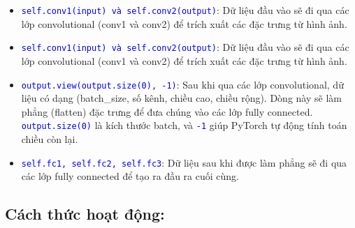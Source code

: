\begin{itemize}
    \item \textcolor{blue}{\texttt{self.conv1(input) và self.conv2(output)}}: Dữ liệu đầu vào sẽ đi qua các lớp convolutional (conv1 và conv2) để trích xuất các đặc trưng từ hình ảnh.
    \item \textcolor{blue}{\texttt{self.conv1(input) và self.conv2(output)}}: Dữ liệu đầu vào sẽ đi qua các lớp convolutional (conv1 và conv2) để trích xuất các đặc trưng từ hình ảnh.
    \item \textcolor{blue}{\texttt{output.view(output.size(0), -1)}}: Sau khi qua các lớp convolutional, dữ liệu có dạng (batch\_size, số kênh, chiều cao, chiều rộng). Dòng này sẽ làm phẳng (flatten) đặc trưng để đưa chúng vào các lớp fully connected. \textcolor{blue}{\texttt{output.size(0)}} là kích thước batch, và \textcolor{blue}{\texttt{-1}} giúp PyTorch tự động tính toán chiều còn lại.
    \item \textcolor{blue}{\texttt{self.fc1, self.fc2, self.fc3}}: Dữ liệu sau khi được làm phẳng sẽ đi qua các lớp fully connected để tạo ra đầu ra cuối cùng.
\end{itemize}

\subsection{Cách thức hoạt động:}

